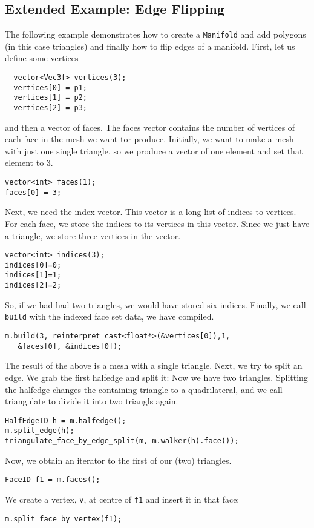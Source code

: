 \documentclass[a4paper]{article}
\begin{document}
\subsection{Extended Example: Edge Flipping}
The following example demonstrates how to create a \texttt{Manifold} and add polygons (in this case triangles) and finally how to flip edges of a manifold. First, let us define some vertices
\begin{verbatim}
  vector<Vec3f> vertices(3);
  vertices[0] = p1;
  vertices[1] = p2;
  vertices[2] = p3;
\end{verbatim}
and then a vector of faces. The faces vector contains the number of vertices of each face in the mesh we want tor produce. Initially, we want to make a mesh with just one single triangle, so we produce a vector of one element and set that element to 3.
\begin{verbatim}
vector<int> faces(1);
faces[0] = 3;
\end{verbatim}
Next, we need the index vector. This vector is a long list of indices to vertices. For each face, we store the indices to its vertices in this vector. Since we just have a triangle, we store three vertices in the vector.
\begin{verbatim}
vector<int> indices(3);
indices[0]=0;
indices[1]=1;
indices[2]=2;
\end{verbatim}
So, if we had had two triangles, we would have stored six indices. Finally, we call \texttt{build} with the indexed face set data, we have compiled. 
\begin{verbatim}
m.build(3, reinterpret_cast<float*>(&vertices[0]),1,
   &faces[0], &indices[0]);
\end{verbatim}
The result of the above is a mesh with a single triangle.
Next, we try to split an edge. We grab the first halfedge and split it: Now we have two triangles. Splitting the halfedge changes the containing triangle to a quadrilateral, and we call triangulate to divide it into two triangls again.
\begin{verbatim}
HalfEdgeID h = m.halfedge();
m.split_edge(h); 
triangulate_face_by_edge_split(m, m.walker(h).face());
\end{verbatim}
Now, we obtain an iterator to the first of our (two) triangles.
\begin{verbatim}
FaceID f1 = m.faces();
\end{verbatim}
We create a vertex, \texttt{v}, at centre of \texttt{f1} and insert it in that face:
\begin{verbatim}
m.split_face_by_vertex(f1);
\end{verbatim}
\end{document}
